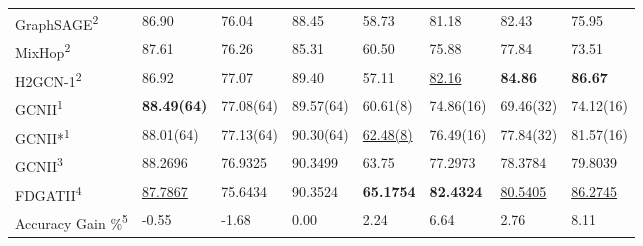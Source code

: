 \documentclass{article}
\begin{document}
\begin{table*}[!htbp]
{\begin{tabular}{llllllll}
GraphSAGE\textsuperscript{2}         & 86.90              & 76.04     & 88.45     & 58.73            & 81.18            & 82.43          & 75.95          \\
MixHop\textsuperscript{2}            & 87.61              & 76.26     & 85.31     & 60.50            & 75.88            & 77.84          & 73.51          \\
H2GCN-1\textsuperscript{2}           & 86.92              & 77.07     & 89.40     & 57.11            & \underline{82.16}      & \textbf{84.86} & \textbf{86.67} \\
GCNII\textsuperscript{1}             & \textbf{88.49(64)} & 77.08(64) & 89.57(64) & 60.61(8)         & 74.86(16)        & 69.46(32)      & 74.12(16)      \\
GCNII*\textsuperscript{1}            & 88.01(64)          & 77.13(64) & 90.30(64) & \underline{62.48(8)}   & 76.49(16)        & 77.84(32)      & 81.57(16)      \\ \midrule
GCNII\textsuperscript{3}            & 88.2696            & 76.9325   & 90.3499   & 63.75            & 77.2973          & 78.3784        & 79.8039        \\ 
FDGATII\textsuperscript{4}           & \underline{87.7867}      & 75.6434   & 90.3524   & \textbf{65.1754} & \textbf{82.4324} & \underline{80.5405}  & \underline{86.2745}  \\ \midrule
Accuracy Gain \%\textsuperscript{5} & -0.55              & -1.68     & 0.00      & 2.24             & 6.64             & 2.76           & 8.11           \\ \bottomrule
\end{tabular}
\label{table_acc}
}
\end{table*}
\end{document}
